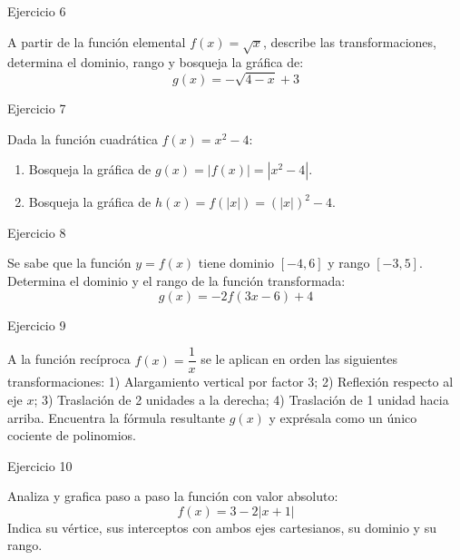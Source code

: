 \documentclass[aspectratio=169]{beamer}
\begin{document}
\begin{frame}{Ejercicio 6}
  \begin{mwejercicio}
    A partir de la función elemental $f(x) = \sqrt{x}$, describe las transformaciones, determina el dominio, rango y bosqueja la gráfica de:
    $$g(x) = -\sqrt{4 - x} + 3$$
  \end{mwejercicio}
  \vspace{3.5cm}
\end{frame}
\begin{frame}{Ejercicio 7}
  \begin{mwejercicio}
    Dada la función cuadrática $f(x) = x^2 - 4$:
    \begin{enumerate}
      \item Bosqueja la gráfica de $g(x) = |f(x)| = |x^2 - 4|$.
      \item Bosqueja la gráfica de $h(x) = f(|x|) = (|x|)^2 - 4$.
    \end{enumerate}
  \end{mwejercicio}
  \vspace{3.5cm}
\end{frame}
\begin{frame}{Ejercicio 8}
  \begin{mwejercicio}
    Se sabe que la función $y = f(x)$ tiene dominio $[-4, 6]$ y rango $[-3, 5]$. Determina el dominio y el rango de la función transformada:
    $$g(x) = -2 f(3x - 6) + 4$$
  \end{mwejercicio}
  \vspace{3.5cm}
\end{frame}
\begin{frame}{Ejercicio 9}
  \begin{mwejercicio}
    A la función recíproca $f(x) = \dfrac{1}{x}$ se le aplican en orden las siguientes transformaciones:
    1) Alargamiento vertical por factor 3; 2) Reflexión respecto al eje $x$; 3) Traslación de 2 unidades a la derecha; 4) Traslación de 1 unidad hacia arriba. Encuentra la fórmula resultante $g(x)$ y exprésala como un único cociente de polinomios.
  \end{mwejercicio}
  \vspace{3.5cm}
\end{frame}
\begin{frame}{Ejercicio 10}
  \begin{mwejercicio}
    Analiza y grafica paso a paso la función con valor absoluto:
    $$f(x) = 3 - 2|x + 1|$$
    Indica su vértice, sus interceptos con ambos ejes cartesianos, su dominio y su rango.
  \end{mwejercicio}
  \vspace{3.5cm}
\end{frame}
\end{document}
